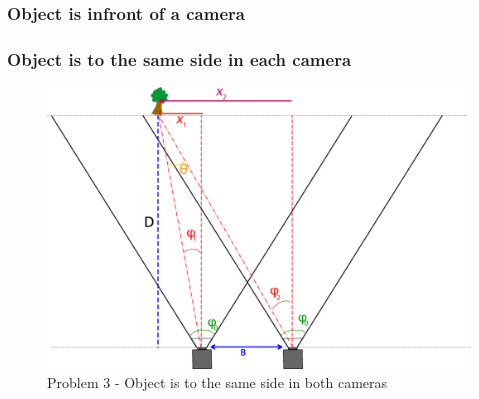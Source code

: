 \subsubsection{Object is infront of a camera}


\subsubsection{Object is to the same side in each camera}

\begin{figure}
\includegraphics[width=\textwidth,height=\textheight,keepaspectratio]{Figures/problem2.png}
\caption{Problem 3 - Object is to the same side in both cameras}
\label{problem_toleft}
\end{figure}
